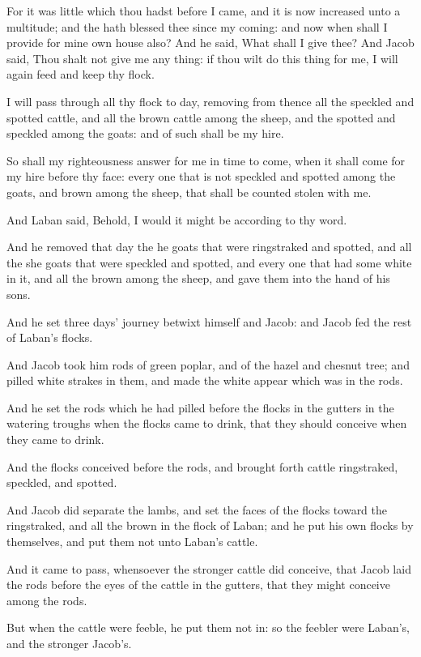 \Verse For it was little which thou hadst before I came, and it is now increased unto a multitude; and the \LORD hath blessed thee since my coming: and now when shall I provide for mine own house also?  \Verse And he said, What shall I give thee? And Jacob said, Thou shalt not give me any thing: if thou wilt do this thing for me, I will again feed and keep thy flock.

\Verse I will pass through all thy flock to day, removing from thence all the speckled and spotted cattle, and all the brown cattle among the sheep, and the spotted and speckled among the goats: and of such shall be my hire.

\Verse So shall my righteousness answer for me in time to come, when it shall come for my hire before thy face: every one that is not speckled and spotted among the goats, and brown among the sheep, that shall be counted stolen with me.

\Verse And Laban said, Behold, I would it might be according to thy word.

\Verse And he removed that day the he goats that were ringstraked and spotted, and all the she goats that were speckled and spotted, and every one that had some white in it, and all the brown among the sheep, and gave them into the hand of his sons.

\Verse And he set three days' journey betwixt himself and Jacob: and Jacob fed the rest of Laban's flocks.

\Verse And Jacob took him rods of green poplar, and of the hazel and chesnut tree; and pilled white strakes in them, and made the white appear which was in the rods.

\Verse And he set the rods which he had pilled before the flocks in the gutters in the watering troughs when the flocks came to drink, that they should conceive when they came to drink.

\Verse And the flocks conceived before the rods, and brought forth cattle ringstraked, speckled, and spotted.

\Verse And Jacob did separate the lambs, and set the faces of the flocks toward the ringstraked, and all the brown in the flock of Laban; and he put his own flocks by themselves, and put them not unto Laban's cattle.

\Verse And it came to pass, whensoever the stronger cattle did conceive, that Jacob laid the rods before the eyes of the cattle in the gutters, that they might conceive among the rods.

\Verse But when the cattle were feeble, he put them not in: so the feebler were Laban's, and the stronger Jacob's.

